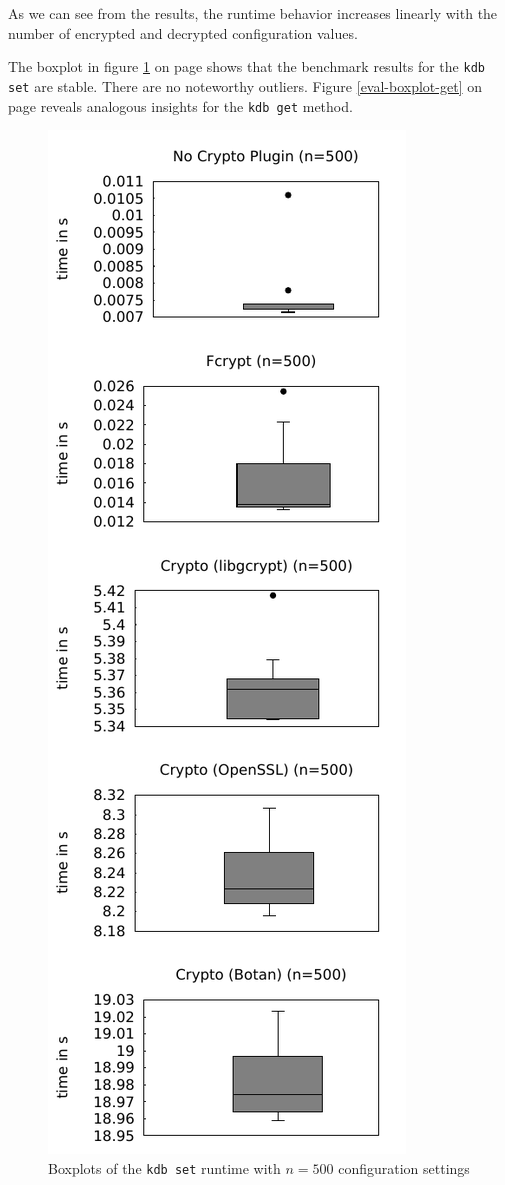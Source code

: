 As we can see from the results, the runtime behavior increases linearly with the number of encrypted and decrypted configuration values.

The boxplot in figure \ref{eval-boxplot-set} on page \pageref{eval-boxplot-set} shows that the benchmark results for the \texttt{kdb set} are stable.
There are no noteworthy outliers.
Figure \ref{eval-boxplot-get} on page \pageref{eval-boxplot-get} reveals analogous insights for the \texttt{kdb get} method.

\begin{figure}[h]
\center
\caption{Boxplots of the \texttt{kdb set} runtime with $n = 500$ configuration settings}
\label{eval-boxplot-set}
\includegraphics{plots/boxplot_500_set.pdf}
\end{figure}

